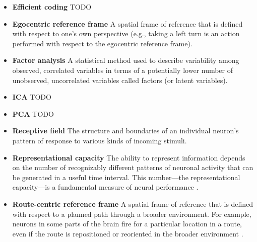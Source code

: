 \begin{itemize}
\item \textbf{Efficient coding} TODO

\item \textbf{Egocentric reference frame}  A spatial frame of reference that is defined with respect to one's own perspective (e.g., taking a left turn is an action performed with respect to the egocentric reference frame).

\item \textbf{Factor analysis}  A statistical method used to describe variability among observed, correlated variables in terms of a potentially lower number of unobserved, uncorrelated variables called factors (or latent variables).


\item \textbf{\Acf{ICA}} TODO


\item \textbf{\Acf{PCA}} TODO

\item \textbf{Receptive field}  The structure and boundaries of an individual neuron's pattern of response to various kinds of incoming stimuli.

\item \textbf{Representational capacity} The ability to represent information depends on the number of recognizably different patterns of neuronal activity that can be generated in a useful time interval. This number---the representational capacity---is a fundamental measure of neural performance \cite{Laughlin2001}.

\item \textbf{Route-centric reference frame}  A spatial frame of reference that is defined with respect to a planned path through a broader environment. For example, neurons in some parts of the brain fire for a particular location in a route, even if the route is repositioned or reoriented in the broader environment \cite{nitz2009parietal}.


\end{itemize}
